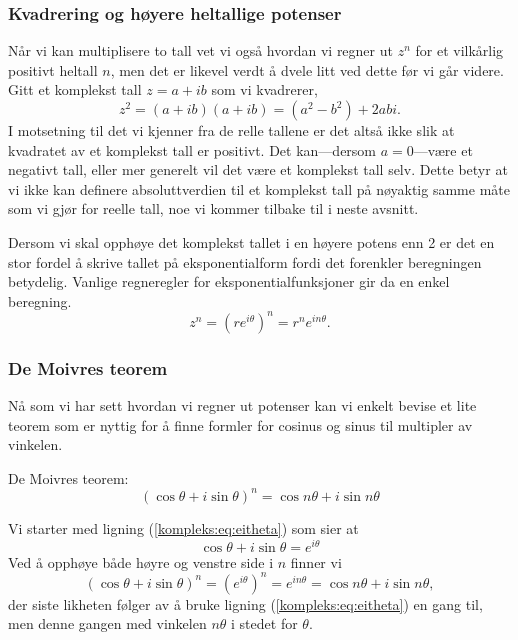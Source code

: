 \documentclass[a4paper,norsk,12pt]{article}
\begin{document}
\subsubsection{Kvadrering og høyere heltallige potenser}
Når vi kan multiplisere to tall vet vi også hvordan vi regner ut $z^n$ for et vilkårlig positivt heltall $n$, men det er likevel verdt å dvele litt ved dette før vi går videre. Gitt et komplekst tall $z=a+ib$ som vi kvadrerer,
\begin{displaymath}
	z^2 = (a+ib)(a+ib) = (a^2-b^2) +2abi.
\end{displaymath}
I motsetning til det vi kjenner fra de relle tallene er det altså ikke slik at kvadratet av et komplekst tall er positivt. Det kan---dersom $a=0$---være et negativt tall, eller mer generelt vil det være et komplekst tall selv. Dette betyr at vi ikke kan definere absoluttverdien til et komplekst tall på nøyaktig samme måte som vi gjør for reelle tall, noe vi kommer tilbake til i neste avsnitt.

Dersom vi skal opphøye det komplekst tallet i en høyere potens enn 2 er det en stor fordel å skrive tallet på eksponentialform fordi det forenkler beregningen betydelig. Vanlige regneregler for eksponentialfunksjoner gir da en enkel beregning.
\begin{displaymath}
	z^n = \left(re^{i\theta}\right)^n = r^n e^{in\theta}.
\end{displaymath}

\subsubsection{De Moivres teorem}
Nå som vi har sett hvordan vi regner ut potenser kan vi enkelt bevise et lite teorem som er nyttig for å finne formler for cosinus og sinus til multipler av vinkelen.
\begin{ttheorem}
De Moivres teorem:
\begin{displaymath}
	\left(\cos\theta + i\sin\theta\right)^n = \cos n\theta + i\sin n\theta
\end{displaymath}
\end{ttheorem}
\begin{tproof}
Vi starter med ligning (\ref{kompleks:eq:eitheta}) som sier at
\begin{displaymath}
	\cos\theta + i\sin\theta = e^{i\theta}
\end{displaymath}
Ved å opphøye både høyre og venstre side i $n$ finner vi
\begin{displaymath}
	\left(\cos\theta+ i\sin\theta\right)^n = \left(e^{i\theta}\right)^n = e^{in\theta} = \cos n\theta + i\sin n\theta,
\end{displaymath}
der siste likheten følger av å bruke ligning (\ref{kompleks:eq:eitheta}) en gang til, men denne gangen med vinkelen $n\theta$ i stedet for $\theta$.
\end{tproof}
\end{document}
